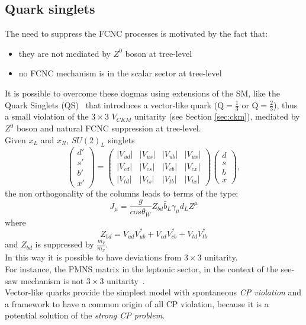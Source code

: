 \subsection{Quark singlets}
The need to suppress the FCNC processes is motivated by the fact that:
\begin{itemize}
	\item they are not mediated by $Z^0$ boson at tree-level
	\item no FCNC mechanism is in the scalar sector at tree-level 
\end{itemize}
It is possible to overcome these dogmas using extensions of the SM, like the Quark Singlets (QS)~\cite{barger} that introduces a vector-like quark ($\mathrm{Q=\frac{1}{3}}$ or $\mathrm{Q=\frac{2}{3}}$), thus a small violation of the $\mathrm{3 \times 3}$ $V_{CKM}$ unitarity (see Section \ref{sec:ckm}), mediated by $Z^0$ boson and natural 
FCNC suppression at tree-level.
\vspace{\baselineskip}
\\Given $x_L$ and $x_R$, $SU(2)_{L}$ singlets
\begin{equation}
\begin{pmatrix}
d' \\ 
s' \\ 
b' \\
x' 
\end{pmatrix} 
=
\begin{pmatrix}
|V_{ud}| & |V_{us}| & |V_{ub}|  & |V_{ux}| \\ 
|V_{cd}| & |V_{cs}| & |V_{cb}|   & |V_{cx}| \\ 
|V_{td}| & |V_{ts}|  &| V_{tb}|   & |V_{tx}|
\end{pmatrix} 
\begin{pmatrix}
d \\ 
s \\ 
b \\
x
\end{pmatrix} ,
\end{equation}
the non orthogonality of the columns leads to terms of the type:
\begin{equation}
J_{\mu}= \frac{g}{cos\theta_W}Z_{bd}\bar{b}_{L}\gamma_{\mu}d_{L}Z^{\mu}
\end{equation}
where
\begin{equation}
Z_{bd}=V_{ud}V^*_{ub}+V_{cd}V^*_{cb}+V_{td}V^*_{tb}
\end{equation}
and $Z_{bd}$ is suppressed by $\frac{m_q}{m_x}$.
\vspace{\baselineskip}
\\In this way it is possible to have deviations from $\mathrm{3 \times 3}$ unitarity.\\
For instance, the PMNS matrix in the leptonic sector, in the context of the see-saw mechanism is not  $\mathrm{3 \times 3}$ unitarity~\cite{pnms}.
\\Vector-like quarks provide the simplest model with spontaneous \textit{CP violation} and a framework to have a common origin
of all CP violation, because it is a potential solution of the \textit{strong CP problem}.

